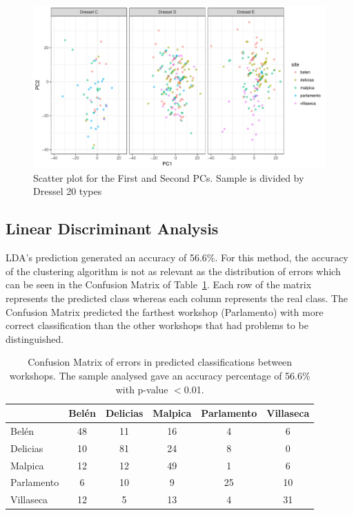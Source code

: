 \documentclass[review]{elsarticle}
\begin{document}
\begin{figure}[htp]
	\centering
\includegraphics[width=\linewidth]{figs/dresseltypes}
\caption{Scatter plot for the First and Second PCs. Sample is divided by Dressel 20 types}
\label{dressel}
\end{figure} 


\subsection{Linear Discriminant Analysis}

LDA's prediction generated an accuracy of 56.6\%. For this method, the accuracy of the clustering algorithm is not as relevant as the distribution of errors which can be seen in the Confusion Matrix of Table~\ref{table:confusion}. Each row of the matrix represents the predicted class whereas each column represents the real class. The Confusion Matrix predicted the farthest workshop (Parlamento) with more correct classification than the other workshops that had problems to be distinguished. 

\begin{table}[htp]
\begin{tabular}{lccccc}
\hline
      & Belén & Delicias & Malpica & Parlamento & Villaseca\\ \hline
Belén & 48 & 11 & 16 & 4 & 6 \\
Delicias & 10 & 81 & 24 & 8 & 0 \\
Malpica & 12 & 12 & 49 & 1 & 6 \\
Parlamento & 6 & 10 & 9 & 25 & 10 \\
Villaseca & 12 & 5 & 13 & 4 & 31 \\
\hline

\end{tabular}
\caption{Confusion Matrix of errors in predicted classifications between workshops. The sample analysed gave an accuracy percentage of 56.6\% with p-value $<$0.01. }
\label{table:confusion}
\end{table}
\end{document}
